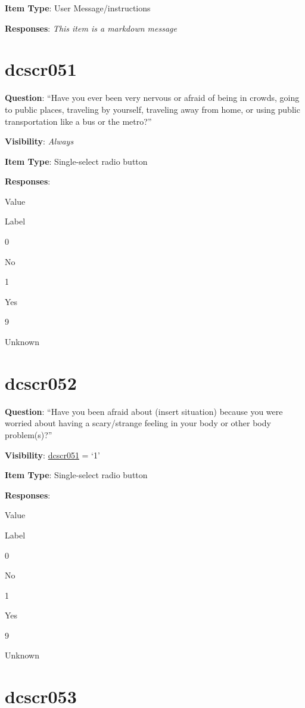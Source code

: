 \documentclass[]{book}
\begin{document}
\textbf{Item Type}: User Message/instructions

\textbf{Responses}: \emph{This item is a markdown message}

\hypertarget{dcscr051}{%
\section{dcscr051}\label{dcscr051}}

\textbf{Question}: ``Have you ever been very nervous or afraid of being in crowds, going to public places, traveling by yourself, traveling away from home, or using public transportation like a bus or the metro?''

\textbf{Visibility}: \emph{Always}

\textbf{Item Type}: Single-select radio button

\textbf{Responses}:

Value

Label

0

No

1

Yes

9

Unknown

\hypertarget{dcscr052}{%
\section{dcscr052}\label{dcscr052}}

\textbf{Question}: ``Have you been afraid about (insert situation) because you were worried about having a scary/strange feeling in your body or other body problem(s)?''

\textbf{Visibility}: \protect\hyperlink{dcscr051}{dcscr051} = `1'

\textbf{Item Type}: Single-select radio button

\textbf{Responses}:

Value

Label

0

No

1

Yes

9

Unknown

\hypertarget{dcscr053}{%
\section{dcscr053}\label{dcscr053}}
\end{document}
